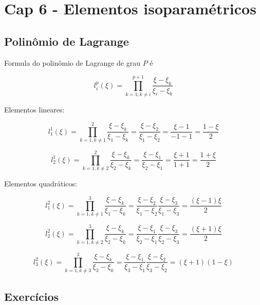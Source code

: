 \section{Cap 6 - Elementos isoparamétricos}

\subsection{Polinômio de Lagrange}

Formula do polinômio de Lagrange de grau $P$ é

\begin{equation}
	l^p_i(\xi) = \prod ^{p+1}_{k=1,k\neq i} \frac{\xi - \xi_k}{\xi_i - \xi_k}
\end{equation}

Elementos lineares:

\begin{equation}
	l^1_1(\xi) = \prod ^{2}_{k=1,k\neq 1} \frac{\xi - \xi_k}{\xi_1 - \xi_k} = \frac{\xi - \xi_2}{\xi_1 - \xi_2} = \frac{\xi - 1}{-1 -1} = \frac{1 - \xi}{2}
\end{equation}

\begin{equation}
	l^1_2(\xi) = \prod ^{2}_{k=1,k\neq 2} \frac{\xi - \xi_k}{\xi_2 - \xi_k} = \frac{\xi - \xi_1}{\xi_2 - \xi_1} = \frac{\xi + 1}{1 + 1} = \frac{1 + \xi}{2}
\end{equation}

Elementos quadráticos:

\begin{equation}
	l^2_1(\xi) = \prod ^{3}_{k=1,k\neq 1} \frac{\xi - \xi_k}{\xi_1 - \xi_k} = \frac{\xi - \xi_2}{\xi_1 - \xi_2} \frac{\xi - \xi_3}{\xi_1 - \xi_3} = \frac{(\xi - 1)\xi}{2}
\end{equation}

\begin{equation}
	l^2_2(\xi) = \prod ^{3}_{k=1,k\neq 2} \frac{\xi - \xi_k}{\xi_2 - \xi_k} = \frac{\xi - \xi_1}{\xi_2 - \xi_1} \frac{\xi - \xi_3}{\xi_2 - \xi_3} = \frac{(\xi + 1)\xi}{2}
\end{equation}

\begin{equation}
	l^2_3(\xi) = \prod ^{3}_{k=1,k\neq 3} \frac{\xi - \xi_k}{\xi_3 - \xi_k} = \frac{\xi - \xi_1}{\xi_3 - \xi_1} \frac{\xi - \xi_2}{\xi_3 - \xi_2} = (\xi + 1)(1 - \xi)
\end{equation}


\subsection{Exercícios}


